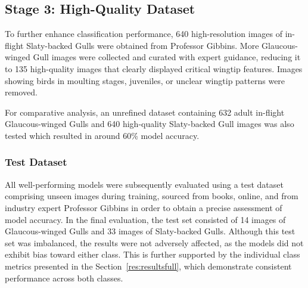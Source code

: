 \documentclass[a4paper,12pt]{report}
\begin{document}
\subsection{Stage 3: High-Quality Dataset}

To further enhance classification performance, 640 high-resolution images of in-flight Slaty-backed Gulls were obtained from Professor Gibbins. More Glaucous-winged Gull images were collected and curated with expert guidance, reducing it to 135 high-quality images that clearly displayed critical wingtip features.  Images showing birds in moulting stages, juveniles, or unclear wingtip patterns were removed.

For comparative analysis, an unrefined dataset containing 632 adult in-flight Glaucous-winged Gulls and 640 high-quality Slaty-backed Gull images was also tested which resulted in around 60\% model accuracy.

\subsubsection{Test Dataset}

All well-performing models were subsequently evaluated using a test dataset comprising unseen images during training, sourced from books, online, and from industry expert Professor Gibbins in order to obtain a precise assessment of model accuracy. In the final evaluation, the test set consisted of 14 images of Glaucous-winged Gulls and 33 images of Slaty-backed Gulls. Although this test set was imbalanced, the results were not adversely affected, as the models did not exhibit bias toward either class. This is further supported by the individual class metrics presented in the Section~\ref{res:resultsfull}, which demonstrate consistent performance across both classes.




\end{document}
